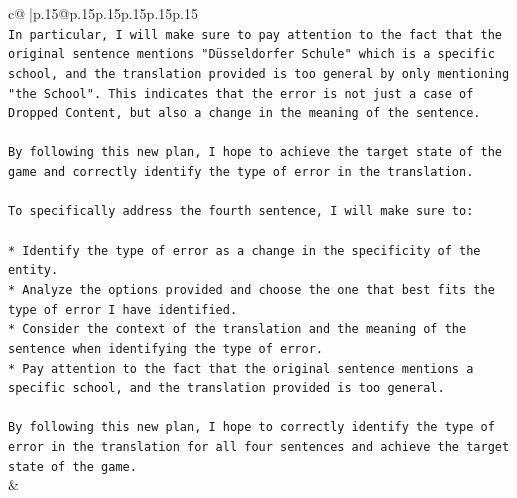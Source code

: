 \documentclass{article}
\begin{document}
{\begin{supertabular}{c@{$\;$}|p{.15\linewidth}@{}p{.15\linewidth}p{.15\linewidth}p{.15\linewidth}p{.15\linewidth}p{.15\linewidth}}
{{{\\ 
\texttt{In particular, I will make sure to pay attention to the fact that the original sentence mentions "Düsseldorfer Schule" which is a specific school, and the translation provided is too general by only mentioning "the School". This indicates that the error is not just a case of Dropped Content, but also a change in the meaning of the sentence.} \\
\\ 
\texttt{By following this new plan, I hope to achieve the target state of the game and correctly identify the type of error in the translation.} \\
\\ 
\texttt{To specifically address the fourth sentence, I will make sure to:} \\
\\ 
\texttt{* Identify the type of error as a change in the specificity of the entity.} \\
\texttt{* Analyze the options provided and choose the one that best fits the type of error I have identified.} \\
\texttt{* Consider the context of the translation and the meaning of the sentence when identifying the type of error.} \\
\texttt{* Pay attention to the fact that the original sentence mentions a specific school, and the translation provided is too general.} \\
\\ 
\texttt{By following this new plan, I hope to correctly identify the type of error in the translation for all four sentences and achieve the target state of the game.} \\
            }
        }
    }
    & \\ \\

\end{supertabular}
}
\end{document}

